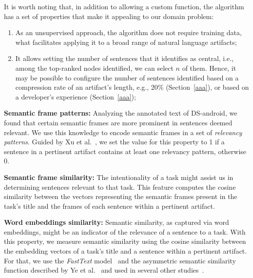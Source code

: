 It is worth noting that,
in addition to allowing a custom function, the algorithm has a set of properties that make it appealing to our domain problem:



\begin{enumerate}
    
    \item As an unsupervised approach, the algorithm does not require training data, what facilitates applying it to a broad range of natural language artifacts;

    \item It allows setting the number of sentences that it identifies as central, i.e., among the top-ranked nodes identified, we can select $n$ of them. Hence, 
    it may be possible to configure the number of sentences identified based on 
    a compression rate of an artifact's length, e.g., 20\% (Section~\ref{aaa}), or 
    based on a developer's experience (Section~\ref{aaa});
    
\end{enumerate}




\vspace{3mm}
\begin{hangparas}{1em}{1}
    \textbf{Semantic frame patterns:} Analyzing the annotated text of \acs{DS-android}, 
    we found that certain semantic frames are more prominent in sentences deemed relevant.
    We use this knowledge to encode semantic frames in a set of \textit{relevancy patterns}. 
    Guided by Xu et al.~\cite{Xu2017}, we set the value for this property to 1 if a sentence in a pertinent artifact contains at least one relevancy pattern, otherwise 0.
\end{hangparas}


\vspace{3mm}
\begin{hangparas}{1em}{1}
    \textbf{Semantic frame similarity:} The intentionality of a task might assist us in determining sentences relevant to that task. 
    This feature computes the cosine similarity between the vectors representing the semantic frames present in the task's title and the frames of each sentence within a pertinent artifact. 
\end{hangparas}


\vspace{3mm}
\begin{hangparas}{1em}{1}
    \textbf{Word embeddings similarity:} Semantic similarity, as captured via word embeddings, might be an indicator of the relevance of a sentence to a task. With this property, we measure semantic similarity using the cosine similarity between the embedding vectors of a task's title and a sentence within a pertinent artifact. 
    For that, we use the \textit{FastText} model~\cite{bojanowski2017FastText} and the asymmetric semantic similarity function described by Ye et al.~\cite{Ye2016} and used in several other studies~\cite{Huang2018, Xu2017, silva2019}.
\end{hangparas}




